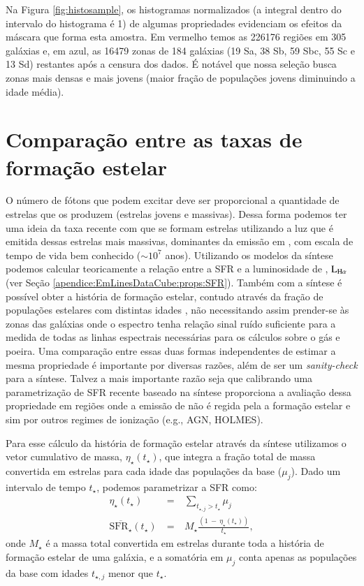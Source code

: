 Na Figura \ref{fig:histosample}, os histogramas normalizados (a integral dentro do intervalo do histograma é 1) de algumas propriedades evidenciam os efeitos da máscara que forma esta amostra. Em vermelho temos as 226176 regiões em 305 galáxias e, em azul, as 16479 zonas de 184 galáxias (19 Sa, 38 Sb, 59 Sbc, 55 Sc e 13 Sd) restantes após a censura dos dados. É notável que nossa seleção busca zonas mais densas e mais jovens (maior fração de populações jovens diminuindo a idade média).
%


\section{Comparação entre as taxas de formação estelar}
\label{apendice:synvsneb:SFR}

O número de fótons que podem excitar \Ha deve ser proporcional a quantidade de estrelas que os produzem (estrelas jovens e massivas). Dessa forma podemos ter uma ideia da taxa recente com que se formam estrelas utilizando a luz que é emitida dessas estrelas mais massivas, dominantes da emissão em \Ha, com escala de tempo de vida bem conhecido ($\sim 10^7$ anos). Utilizando os modelos da síntese podemos calcular teoricamente a relação entre a SFR e a luminosidade de \Ha, $\LHalpha$ (ver Seção \ref{apendice:EmLinesDataCube:props:SFR}). Também com a síntese é possível obter a história de formação estelar, contudo através da fração de populações estelares com distintas idades \citep{Asari.etal.2007a}, não necessitando assim prender-se às zonas das galáxias onde o espectro tenha relação sinal ruído suficiente para a medida de todas as linhas espectrais necessárias para os cálculos sobre o gás e poeira. Uma comparação entre essas duas formas independentes de estimar a mesma propriedade é importante por diversas razões, além de ser um {\em sanity-check} para a síntese. Talvez a mais importante razão seja que calibrando uma parametrização de SFR recente baseado na síntese proporciona a avaliação dessa propriedade em regiões onde a emissão de \Ha não é regida pela a formação estelar e sim por outros regimes de ionização (e.g., AGN, HOLMES).

Para esse cálculo da história de formação estelar através da síntese utilizamos o vetor cumulativo de massa, $\eta_\star(t_\star)$, que integra a fração total de massa convertida em estrelas para cada idade das populações da base ($\mu_j$). Dado um intervalo de tempo $t_\star$, podemos parametrizar a SFR como:
\begin{eqnarray}
	\eta_\star(t_\star)\ &=&\ \sum\limits_{t_{\star,j} > t_\star} \mu_j \\
	\overline{\mathrm{SFR}_\star}(t_\star)\ &=&\ M_\star \frac{(1\ -\ \eta_\star(t_\star))}{t_\star},
	\label{eq:SFRSyn}
\end{eqnarray}
\noindent onde $M_\star$ é a massa total convertida em estrelas durante toda a história de formação estelar de uma galáxia, e a somatória em $\mu_j$ conta apenas as populações da base com idades $t_{\star,j}$ menor que $t_\star$.

